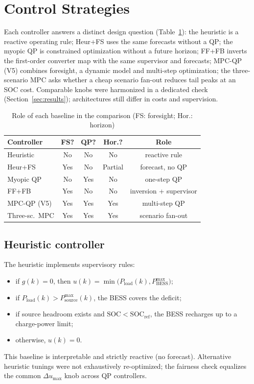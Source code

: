 \documentclass{ieeeaccess}
\begin{document}
\section{Control Strategies}
\label{sec:control}

Each controller answers a distinct design question (Table~\ref{tab:baseline_role}): the heuristic is a reactive operating rule; Heur+FS uses the same forecasts without a QP; the myopic QP is constrained optimization without a future horizon; FF+FB inverts the first-order converter map with the same supervisor and forecasts; MPC-QP (V5) combines foresight, a dynamic model and multi-step optimization; the three-scenario MPC asks whether a cheap scenario fan-out reduces tail peaks at an SOC cost. Comparable knobs were harmonized in a dedicated check (Section~\ref{sec:results}); architectures still differ in costs and supervision.

\begin{table}[!t]
\centering
\caption{Role of each baseline in the comparison (FS: foresight; Hor.: horizon)}
\label{tab:baseline_role}
{\footnotesize\setlength{\tabcolsep}{2.5pt}%
\begin{tabular}{@{}lcccc@{}}
\toprule
Controller & FS? & QP? & Hor.? & Role \\
\midrule
Heuristic & No & No & No & reactive rule \\
Heur+FS & Yes & No & Partial & forecast, no QP \\
Myopic QP & No & Yes & No & one-step QP \\
FF+FB & Yes & No & No & inversion + supervisor \\
MPC-QP (V5) & Yes & Yes & Yes & multi-step QP \\
Three-sc.\ MPC & Yes & Yes & Yes & scenario fan-out \\
\bottomrule
\end{tabular}}
\end{table}

\subsection{Heuristic controller}
The heuristic implements supervisory rules:
\begin{itemize}
\item if $g(k)=0$, then $u(k)=\min\!\big(P_{\mathrm{load}}(k),P_{\mathrm{BESS}}^{\max}\big)$;
\item if $P_{\mathrm{load}}(k)>P_{\mathrm{source}}^{\max}(k)$, the BESS covers the deficit;
\item if source headroom exists and $\mathrm{SOC}<\mathrm{SOC}_{\mathrm{ref}}$, the BESS recharges up to a charge-power limit;
\item otherwise, $u(k)=0$.
\end{itemize}
This baseline is interpretable and strictly reactive (no forecast). Alternative heuristic tunings were not exhaustively re-optimized; the fairness check equalizes the common $\Delta u_{\max}$ knob across QP controllers.
\end{document}
